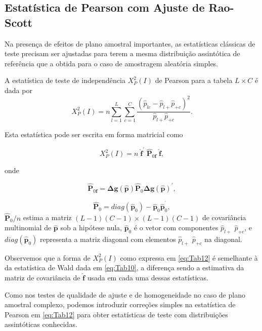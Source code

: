 \documentclass[]{book}
\numberwithin{example}{chapter}
\numberwithin{remark}{chapter}
\numberwithin{definition}{chapter}
\begin{document}
\subsection{Estatística de Pearson com Ajuste de
Rao-Scott}\label{estatistica-de-pearson-com-ajuste-de-rao-scott}

Na presença de efeitos de plano amostral importantes, as estatísticas
clássicas de teste precisam ser ajustadas para terem a mesma
distribuição assintótica de referência que a obtida para o caso de
amostragem aleatória simples.

A estatística de teste de independência \(X_{P}^{2}\left( I\right)\) de
Pearson para a tabela \(L\times C\) é dada por \[
X_{P}^{2}\left( I\right) =n\sum\limits_{l=1}^{L}\sum\limits_{c=1}^{C}\frac{
\left( \hat{p}_{lc}-\hat{p}_{l+}\hat{p}_{+c}\right) ^{2}}{\hat{p}_{l+}\hat{p}
_{+c}}.
\]

Esta estatística pode ser escrita em forma matricial como

\begin{equation}
X_{P}^{2}\left( I\right) =n\;\mathbf{\hat{f}}^{\prime }\;\widehat{\mathbf{P}}
_{0\mathbf{f}}\;\mathbf{\hat{f}},  \label{eq:Tab12}
\end{equation}

onde

\begin{equation}
\widehat{\mathbf{P}}_{0\mathbf{f}}=\mathbf{\Delta g}\left( \mathbf{\hat{p}}
\right) \mathbf{\hat{P}}_{0}\mathbf{\Delta g}\left( \mathbf{\hat{p}}\right)
^{\prime },  \label{eq:Tab13}
\end{equation}

\[
\mathbf{\hat{P}}_{0}=diag\left( \mathbf{\hat{p}}_{0}\right) -\mathbf{\hat{p}}
_{0}\mathbf{\hat{p}}_{0}^{^{\prime }}, 
\] \(\widehat{\mathbf{P}}_{0}/n\) estima a matriz
\(\left( L-1\right) \left( C-1\right) \times \left( L-1\right) \left( C-1\right)\)
de covariância multinomial de \(\mathbf{\hat{p}}\) sob a hipótese nula,
\(\mathbf{\hat{p}}_{0}\) é o vetor com componentes \(\hat{p}_{l+}\)
\(\hat{p}_{+c}\), e \(diag\left( \mathbf{\hat{p}}_{0}\right)\)
representa a matriz diagonal com elementos \(\hat{p}_{l+}\)
\(\hat{p}_{+c}\) na diagonal.

Observemos que a forma de \(X_{P}^{2}\left( I\right)\) como expressa em
\eqref{eq:Tab12} é semelhante à da estatística de Wald dada em
\eqref{eq:Tab10}, a diferença sendo a estimativa da matriz de covariância
de \(\mathbf{\hat{f}}\) usada em cada uma dessas estatísticas.

Como nos testes de qualidade de ajuste e de homogeneidade no caso de
plano amostral complexo, podemos introduzir correções simples na
estatística de Pearson em \eqref{eq:Tab12} para obter estatísticas de
teste com distribuições assintóticas conhecidas.
\end{document}
